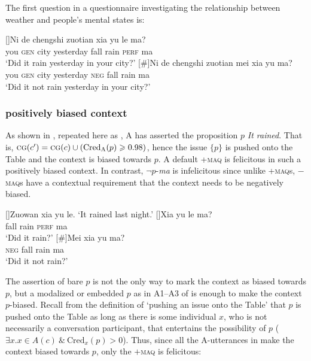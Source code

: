 \documentclass[output=paper,colorlinks,citecolor=brown]{langscibook}
\begin{document}
\ea\label{dii2}The first question in a questionnaire investigating the relationship between  weather and people's mental states is:
\begin{xlist}
[]{\gll Ni de chengshi zuotian  xia yu le ma?\\
you \textsc{gen} city yesterday fall rain \textsc{perf} ma \\
\glt `Did it rain yesterday in your city?'}
[\#]{\gll Ni de chengshi zuotian mei xia yu  ma?\\
you \textsc{gen} city yesterday \textsc{neg} fall rain ma \\
\glt `Did it not rain  yesterday in your city?'}
\end{xlist}
\z

\subsubsection{positively biased context}\label{subsubsec:pos}

As shown  in , repeated here as ,  A  has asserted the proposition $p$ \textit{It rained}. That is, $\textsc{cg}({c}') = \textsc{cg}({c}) \cup (\mathrm{Cred}_{\mathrm{A}}(p) \geqslant 0.98)$, hence the issue $\{p\}$ is pushed onto the Table and the context is biased towards $p$. A default +\textsc{maq} is felicitous in such a positively biased context.  In contrast,  $\neg p$-\emph{ma} is infelicitous since unlike  +\textsc{maq}s, $-$\textsc{maq}s have a contextual requirement that the context needs to be negatively biased.

\ea\label{4.56wrr}
\begin{xlist}
[]{Zuowan xia yu le.
\glt `It rained last night.'}
[]{\gll Xia yu le ma?\\
fall rain \textsc{perf} ma\\
\glt `Did it rain?' }
[\#]{\gll Mei xia yu ma?\\
\textsc{neg} fall rain ma\\
\glt `Did it not rain?' }
\end{xlist}
\z


The assertion of bare $p$ is not the only way to mark the context as biased towards $p$, but a modalized or embedded $p$ as in A1--A3 of   is enough to make the context $p$-biased.  Recall from the definition of `pushing an issue onto the Table'  that $p$ is pushed onto the Table as long as there is some individual $x$, who is not necessarily a conversation participant, that entertains the possibility of $p$ ($\exists x.x\in A({c})\ \&\ \mathrm{Cred}_{x}(p) > 0$).  Thus, since all the A-utterances in     make the context biased towards $p$, only the $+$\textsc{maq} is felicitous:
\end{document}
